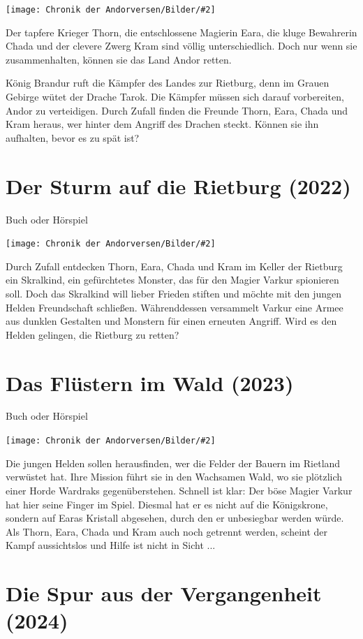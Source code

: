 \documentclass[10pt, a4paper, oneside]{book}
\newcommand{\fillbreak}{\vspace*{\fill}\columnbreak}
\newcommand{\produkt}[1]{%
    \section{#1}%
    \label{Produkt: #1}%
}
\newcommand{\bildmitts}[2][height=0.32\textwidth,width=0.48\textwidth,keepaspectratio]{%
    \begin{center}
        \texttt{[image: Chronik der Andorversen/Bilder/\#2]}
    \end{center}
}
\begin{document}
\begin{multicols}{2}
\bildmitts{Der Fluch des roten Drachen (2021).png}

Der tapfere Krieger Thorn, die entschlossene Magierin Eara, die kluge Bewahrerin Chada und der clevere Zwerg Kram sind völlig unterschiedlich. Doch nur wenn sie zusammenhalten, können sie das Land Andor retten.

König Brandur ruft die Kämpfer des Landes zur Rietburg, denn im Grauen Gebirge wütet der Drache Tarok. Die Kämpfer müssen sich darauf vorbereiten, Andor zu verteidigen. Durch Zufall finden die Freunde Thorn, Eara, Chada und Kram heraus, wer hinter dem Angriff des Drachen steckt. Können sie ihn aufhalten, bevor es zu spät ist?





\produkt{Der Sturm auf die Rietburg (2022)}

\begin{center}
    Buch oder Hörspiel
\end{center}

\bildmitts{Der Sturm auf die Rietburg (2022).png}

Durch Zufall entdecken Thorn, Eara, Chada und Kram im Keller der Rietburg ein Skralkind, ein gefürchtetes Monster, das für den Magier Varkur spionieren soll. Doch das Skralkind will lieber Frieden stiften und möchte mit den jungen Helden Freundschaft schließen. Währenddessen versammelt Varkur eine Armee aus dunklen Gestalten und Monstern für einen erneuten Angriff. Wird es den Helden gelingen, die Rietburg zu retten?

\fillbreak
\produkt{Das Flüstern im Wald (2023)}

\begin{center}
    Buch oder Hörspiel
\end{center}

\bildmitts{Das Flüstern im Wald (2023).png}

Die jungen Helden sollen herausfinden, wer die Felder der Bauern im Rietland verwüstet hat. Ihre Mission führt sie in den Wachsamen Wald, wo sie plötzlich einer Horde Wardraks gegenüberstehen. Schnell ist klar: Der böse Magier Varkur hat hier seine Finger im Spiel. Diesmal hat er es nicht auf die Königskrone, sondern auf Earas Kristall abgesehen, durch den er unbesiegbar werden würde. Als Thorn, Eara, Chada und Kram auch noch getrennt werden, scheint der Kampf aussichtslos und Hilfe ist nicht in Sicht ...




\produkt{Die Spur aus der Vergangenheit (2024)}


\end{multicols}
\end{document}
